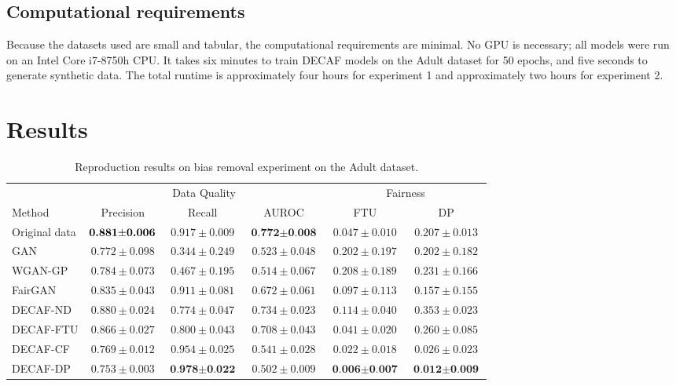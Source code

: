 \subsection{Computational requirements}

Because the datasets used are small and tabular, the computational requirements are minimal. No GPU is necessary; all models were run on an Intel Core i7-8750h CPU. It takes six minutes to train DECAF models on the Adult dataset \citep{Dua:2019} for 50 epochs, and five seconds to generate synthetic data. The total runtime is approximately four hours for experiment 1 and approximately two hours for experiment 2.

\section{Results}

\begin{table}[t]\centering
\small\addtolength{\tabcolsep}{-0.2pt}
\caption{Reproduction results on bias removal experiment on the Adult dataset.}
\label{tab:Adult}
\begin{tabular}{l|ccccc}

\hline
                & \multicolumn{3}{c|}{Data Quality}      & \multicolumn{2}{c}{Fairness} \\ \cline{2-6} 
Method          & Precision         & Recall            & \multicolumn{1}{c|}{AUROC}            & FTU               & DP \\ \hline
Original data   & $\textbf{0.881$ \pm $0.006}$   & $0.917\pm0.009$   & \multicolumn{1}{c|}{$\textbf{0.772$\pm$0.008}$}  & $0.047\pm0.010$   & $0.207\pm0.013$ \\
GAN             & $0.772\pm0.098$   & $0.344\pm0.249$   & \multicolumn{1}{c|}{$0.523\pm0.048$}  & $0.202\pm0.197$   & $0.202\pm0.182$ \\
WGAN-GP         & $0.784\pm0.073$   & $0.467\pm0.195$   & \multicolumn{1}{c|}{$0.514\pm0.067$}  & $0.208\pm0.189$   & $0.231\pm0.166$ \\
FairGAN         & $0.835\pm0.043$   & $0.911\pm0.081$   & \multicolumn{1}{c|}{$0.672\pm0.061$}  & $0.097\pm0.113$   & $0.157\pm0.155$ \\
DECAF-ND        & $0.880\pm0.024$   & $0.774\pm0.047$   & \multicolumn{1}{c|}{$0.734\pm0.023$}  & $0.114\pm0.040$   & $0.353\pm0.023$ \\
DECAF-FTU       & $0.866\pm0.027$   & $0.800\pm0.043$   & \multicolumn{1}{c|}{$0.708\pm0.043$}  & $0.041\pm0.020$   & $0.260\pm0.085$ \\
DECAF-CF        & $0.769\pm0.012$   & $0.954\pm0.025$   & \multicolumn{1}{c|}{$0.541\pm0.028$}  & $0.022\pm0.018$   & $0.026\pm0.023$ \\
DECAF-DP        & $0.753\pm0.003$   & $\textbf{0.978$\pm$0.022}$   & \multicolumn{1}{c|}{$0.502\pm0.009$}  & $\textbf{0.006$\pm$0.007}$   & $\textbf{0.012$\pm$0.009}$ \\
\hline
\end{tabular}
\end{table}


